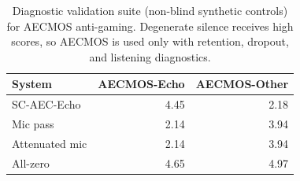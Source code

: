 \begin{table}[t]
\caption{Diagnostic validation suite (non-blind synthetic controls) for AECMOS anti-gaming. Degenerate silence receives high scores, so AECMOS is used only with retention, dropout, and listening diagnostics.}
\label{tab:aecmos-controls}
\centering
\small
\begin{tabular}{lrr}
\hline
System & AECMOS-Echo & AECMOS-Other \\
\hline
SC-AEC-Echo & 4.45 & 2.18 \\
Mic pass & 2.14 & 3.94 \\
Attenuated mic & 2.14 & 3.94 \\
All-zero & 4.65 & 4.97 \\
\hline
\end{tabular}
\end{table}
